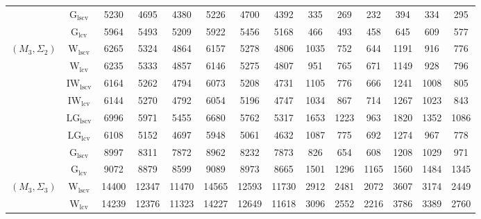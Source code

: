 \begin{table}[!ht]
{\begin{tabular}{@{}cc|ccc|ccc|ccc|ccc@{}}
 & $\mathrm{G}_{\mathrm{lscv}}$ & 5230 & 4695 & 4380 & 5226 & 4700 & 4392 & \cellcolor{black!30}335 & \cellcolor{black!30}269 & \cellcolor{black!30}232 & \cellcolor{black!30}394 & \cellcolor{black!30}334 & \cellcolor{black!30}295 \\ 
 & $\mathrm{G}_{\mathrm{lcv}}$ & 5964 & 5493 & 5209 & 5922 & 5456 & 5168 & \cellcolor{black!10}466 & 493 & 458 & \cellcolor{black!10}645 & 609 & 577 \\ 
\midrule
$(M_3,\Sigma_2)$ & $\mathrm{W}_{\mathrm{lscv}}$ & 6265 & 5324 & 4864 & 6157 & 5278 & 4806 & 1035 & \cellcolor{black!10}752 & \cellcolor{black!10}644 & \cellcolor{black!10}1191 & \cellcolor{black!30}916 & \cellcolor{black!30}776 \\ 
 & $\mathrm{W}_{\mathrm{lcv}}$ & 6235 & 5333 & 4857 & 6146 & 5275 & 4807 & \cellcolor{black!10}951 & 765 & 671 & \cellcolor{black!30}1149 & \cellcolor{black!10}928 & 796 \\ 
 & $\mathrm{IW}_{\mathrm{lscv}}$ & 6164 & \cellcolor{black!10}5262 & 4794 & 6073 & 5208 & \cellcolor{black!10}4731 & 1105 & 776 & 666 & 1241 & 1008 & 805 \\ 
 & $\mathrm{IW}_{\mathrm{lcv}}$ & \cellcolor{black!10}6144 & 5270 & \cellcolor{black!10}4792 & \cellcolor{black!10}6054 & \cellcolor{black!10}5196 & 4747 & 1034 & 867 & 714 & 1267 & 1023 & 843 \\ 
 & $\mathrm{LG}_{\mathrm{lscv}}$ & 6996 & 5971 & 5455 & 6680 & 5762 & 5317 & 1653 & 1223 & 963 & 1820 & 1352 & 1086 \\ 
 & $\mathrm{LG}_{\mathrm{lcv}}$ & \cellcolor{black!30}6108 & \cellcolor{black!30}5152 & \cellcolor{black!30}4697 & \cellcolor{black!30}5948 & \cellcolor{black!30}5061 & \cellcolor{black!30}4632 & 1087 & 775 & 692 & 1274 & 967 & \cellcolor{black!10}778 \\ 
 & $\mathrm{G}_{\mathrm{lscv}}$ & 8997 & 8311 & 7872 & 8962 & 8232 & 7873 & \cellcolor{black!30}826 & \cellcolor{black!30}654 & \cellcolor{black!30}608 & 1208 & 1029 & 971 \\ 
 & $\mathrm{G}_{\mathrm{lcv}}$ & 9072 & 8879 & 8599 & 9089 & 8973 & 8665 & 1501 & 1296 & 1165 & 1560 & 1484 & 1345 \\ 
\midrule
$(M_3,\Sigma_3)$ & $\mathrm{W}_{\mathrm{lscv}}$ & 14400 & 12347 & 11470 & 14565 & 12593 & 11730 & \cellcolor{black!30}2912 & \cellcolor{black!30}2481 & \cellcolor{black!30}2072 & \cellcolor{black!30}3607 & \cellcolor{black!30}3174 & \cellcolor{black!30}2449 \\ 
 & $\mathrm{W}_{\mathrm{lcv}}$ & 14239 & 12376 & 11323 & 14227 & 12649 & 11618 & \cellcolor{black!10}3096 & \cellcolor{black!10}2552 & \cellcolor{black!10}2216 & \cellcolor{black!10}3786 & \cellcolor{black!10}3389 & \cellcolor{black!10}2760 \\ 

\end{tabular}}
\end{table}

